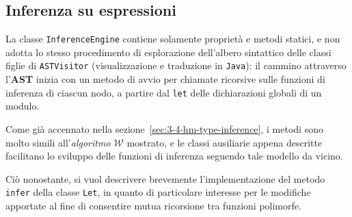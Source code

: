 \subsection{Inferenza su espressioni}
\label{sec:5-9-expression-inference}

La classe \texttt{InferenceEngine} contiene solamente proprietà e metodi statici, e non adotta lo stesso
procedimento di esplorazione dell'albero sintattico delle classi figlie di \texttt{ASTVisitor}
(visualizzazione e traduzione in \texttt{Java}): il cammino attraverso l'\textbf{AST} inizia con un metodo
di avvio per chiamate ricorsive sulle funzioni di inferenza di ciascun nodo,
a partire dal \texttt{let} delle dichiarazioni globali di un modulo.


Come già accennato nella sezione~\ref{sec:3-4-hm-type-inference}, i metodi sono molto simili all'\textit{algoritmo $\mathcal{W}$} mostrato,
e le classi ausiliarie appena descritte facilitano lo sviluppo delle funzioni di inferenza seguendo tale modello da vicino.

\noindent Ciò nonostante, si vuol descrivere brevemente l'implementazione del metodo \texttt{infer} della classe \texttt{Let},
in quanto di particolare interesse per le modifiche apportate al fine di consentire mutua ricorsione tra funzioni polimorfe.

